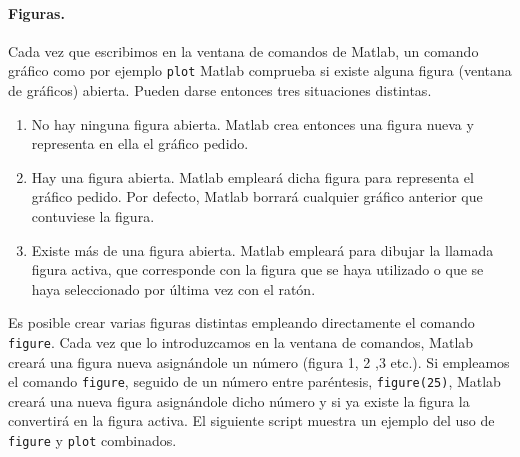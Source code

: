 \paragraph{Figuras.} Cada vez que escribimos en la ventana de comandos de Matlab, un comando gráfico como por ejemplo \texttt{plot} Matlab comprueba si existe alguna figura (ventana de gráficos) abierta. Pueden darse entonces tres situaciones distintas. 

\begin{enumerate}
\item No hay ninguna figura abierta. Matlab crea entonces una figura nueva y representa en ella el gráfico pedido.
\item Hay una figura abierta. Matlab empleará dicha figura para representa el gráfico pedido. Por defecto, Matlab borrará cualquier gráfico anterior que contuviese la figura.
\item Existe más de una figura abierta. Matlab empleará para dibujar la llamada figura activa, que corresponde con la figura que se haya utilizado o que se haya seleccionado por última vez con el ratón.
\end{enumerate}

Es posible crear varias figuras distintas empleando directamente el comando \texttt{figure}. Cada vez que lo introduzcamos en la ventana de comandos, Matlab creará una figura nueva asignándole un número (figura 1, 2 ,3 etc.). Si empleamos el comando \texttt{figure}, seguido de un número entre paréntesis, \texttt{figure(25)}, Matlab creará una nueva figura asignándole dicho número y si ya existe la figura la convertirá en la figura activa.
El siguiente script muestra un ejemplo del uso de \texttt{figure} y \texttt{plot} combinados.








